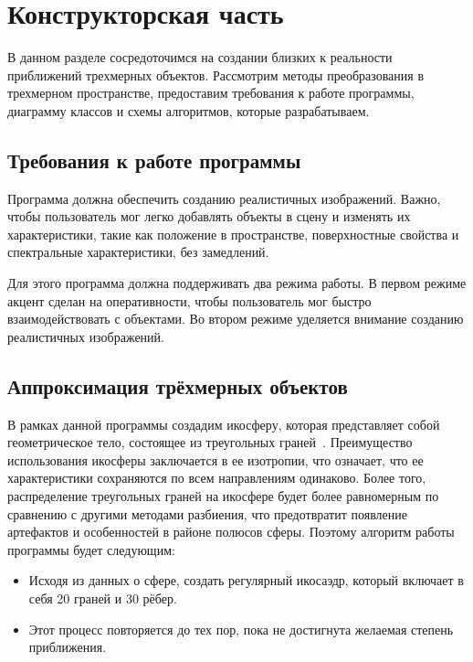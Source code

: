 \chapter{Конструкторская часть}

В данном разделе сосредоточимся на создании близких к реальности приближений трехмерных объектов. 
Рассмотрим методы преобразования в трехмерном пространстве, предоставим требования к работе программы, диаграмму классов и схемы алгоритмов, которые разрабатываем.

\section{Требования к работе программы}

Программа должна обеспечить созданию реалистичных изображений. 
Важно, чтобы пользователь мог легко добавлять объекты в сцену и изменять их характеристики, такие как положение в пространстве, поверхностные свойства и спектральные характеристики, без замедлений. 

Для этого программа должна поддерживать два режима работы. 
В первом режиме акцент сделан на оперативности, чтобы пользователь мог быстро взаимодействовать с объектами.  
Во втором режиме уделяется внимание созданию реалистичных изображений.

\section{Аппроксимация трёхмерных объектов}

В рамках данной программы создадим икосферу, которая представляет собой геометрическое тело, состоящее из треугольных граней~\cite{icosphere}. Преимущество использования икосферы заключается в ее изотропии, что означает, что ее характеристики сохраняются по всем направлениям одинаково. 
Более того, распределение треугольных граней на икосфере будет более равномерным по сравнению с другими методами разбиения, что предотвратит появление артефактов и особенностей в районе полюсов сферы. Поэтому алгоритм работы программы будет следующим:
\begin{itemize}
	\item Исходя из данных о сфере, создать регулярный икосаэдр, который включает в себя 20 граней и 30 рёбер.
	\item Этот процесс повторяется до тех пор, пока не достигнута желаемая степень приближения.
\end{itemize}

